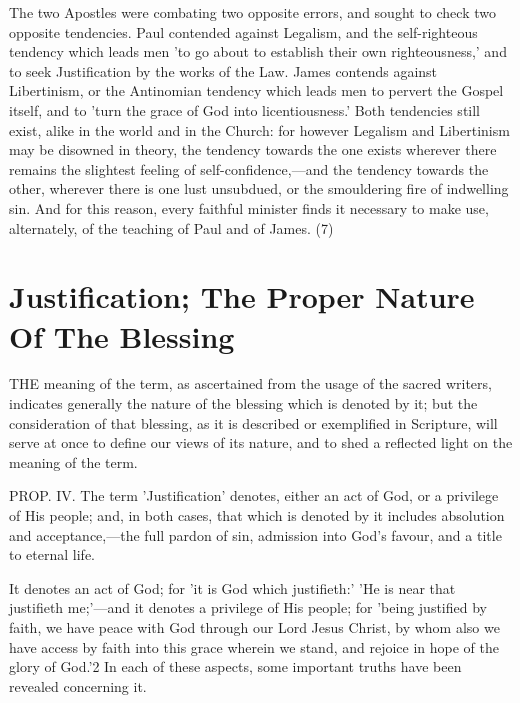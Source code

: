 \documentclass[
]{book}
\begin{document}
The two Apostles were combating two opposite errors, and sought to check two opposite tendencies. Paul contended against Legalism, and the self-righteous tendency which leads men 'to go about to establish their own righteousness,' and to seek Justification by the works of the Law. James contends against Libertinism, or the Antinomian tendency which leads men to pervert the Gospel itself, and to 'turn the grace of God into licentiousness.' Both tendencies still exist, alike in the world and in the Church: for however Legalism and Libertinism may be disowned in theory, the tendency towards the one exists wherever there remains the slightest feeling of self-confidence,---and the tendency towards the other, wherever there is one lust unsubdued, or the smouldering fire of indwelling sin. And for this reason, every faithful minister finds it necessary to make use, alternately, of the teaching of Paul and of James. (7)

\hypertarget{justification-the-proper-nature-of-the-blessing}{%
\chapter{Justification; The Proper Nature Of The Blessing}\label{justification-the-proper-nature-of-the-blessing}}

THE meaning of the term, as ascertained from the usage of the sacred writers, indicates generally the nature of the blessing which is denoted by it; but the consideration of that blessing, as it is described or exemplified in Scripture, will serve at once to define our views of its nature, and to shed a reflected light on the meaning of the term.

PROP. IV. The term 'Justification' denotes, either an act of God, or a privilege of His people; and, in both cases, that which is denoted by it includes absolution and acceptance,---the full pardon of sin, admission into God's favour, and a title to eternal life.

It denotes an act of God; for 'it is God which justifieth:' 'He is near that justifieth me;'---and it denotes a privilege of His people; for 'being justified by faith, we have peace with God through our Lord Jesus Christ, by whom also we have access by faith into this grace wherein we stand, and rejoice in hope of the glory of God.'2 In each of these aspects, some important truths have been revealed concerning it.
\end{document}
